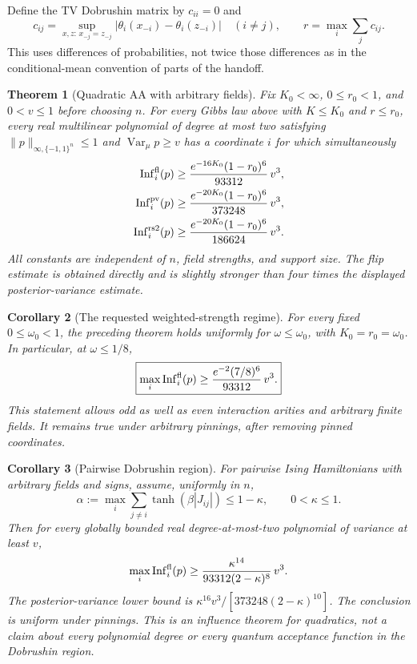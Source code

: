 \documentclass[11pt]{article}
\newtheorem{theorem}{Theorem}[section]
\newtheorem{corollary}[theorem]{Corollary}
\newcommand{\Var}{\operatorname{Var}}
\newcommand{\Inf}{\operatorname{Inf}}
\begin{document}
Define the TV Dobrushin matrix by $c_{ii}=0$ and
\[
 c_{ij}=\sup_{x,z:\,x_{-j}=z_{-j}}
       |\theta_i(x_{-i})-\theta_i(z_{-i})|\quad(i\ne j),
 \qquad r=\max_i\sum_j c_{ij}.
\]
This uses differences of probabilities, not twice those differences
as in the conditional-mean convention of parts of the handoff.

\begin{theorem}[Quadratic AA with arbitrary fields]
\label{thm:main}
Fix $K_0<\infty$, $0\le r_0<1$, and $0<v\le1$ before choosing
$n$. For every Gibbs law above with $K\le K_0$ and $r\le r_0$,
every real multilinear polynomial of degree at most two satisfying
$\|p\|_{\infty,\{-1,1\}^n}\le1$ and $\Var_\mu p\ge v$ has
a coordinate $i$ for which simultaneously
\begin{align}
 \Inf_i^{\rm fl}(p)&\ge
       \frac{e^{-16K_0}(1-r_0)^6}{93312}\,v^3,
       \label{eq:main-fl}\\
 \Inf_i^{\rm pv}(p)&\ge
       \frac{e^{-20K_0}(1-r_0)^6}{373248}\,v^3,
       \label{eq:main-pv}\\
 \Inf_i^{\rm rs2}(p)&\ge
       \frac{e^{-20K_0}(1-r_0)^6}{186624}\,v^3.
       \label{eq:main-rs}
\end{align}
All constants are independent of $n$, field strengths, and support size.
The flip estimate is obtained directly and is slightly stronger than
four times the displayed posterior-variance estimate.
\end{theorem}

\begin{corollary}[The requested weighted-strength regime]
\label{cor:omega}
For every fixed $0\le\omega_0<1$, the preceding theorem holds
uniformly for $\omega\le\omega_0$, with $K_0=r_0=\omega_0$.
In particular, at $\omega\le1/8$,
\[
 \boxed{\max_i\Inf_i^{\rm fl}(p)
       \ge \frac{e^{-2}(7/8)^6}{93312}\,v^3.}
\]
This statement allows odd as well as even interaction arities and
arbitrary finite fields. It remains true under arbitrary pinnings,
after removing pinned coordinates.
\end{corollary}

\begin{corollary}[Pairwise Dobrushin region]
\label{cor:dobrushin}
For pairwise Ising Hamiltonians with arbitrary fields and signs,
assume, uniformly in $n$,
\[
 \alpha:=\max_i\sum_{j\ne i}\tanh(\beta|J_{ij}|)
       \le1-\kappa,\qquad 0<\kappa\le1.
\]
Then for every globally bounded real degree-at-most-two polynomial
of variance at least $v$,
\[
 \max_i\Inf_i^{\rm fl}(p)
 \ge\frac{\kappa^{14}}{93312(2-\kappa)^8}\,v^3.
\]
The posterior-variance lower bound is
$\kappa^{16}v^3/[373248(2-\kappa)^{10}]$.
The conclusion is uniform under pinnings. This is an influence theorem
for quadratics, not a claim about every polynomial degree or every
quantum acceptance function in the Dobrushin region.
\end{corollary}
\end{document}
